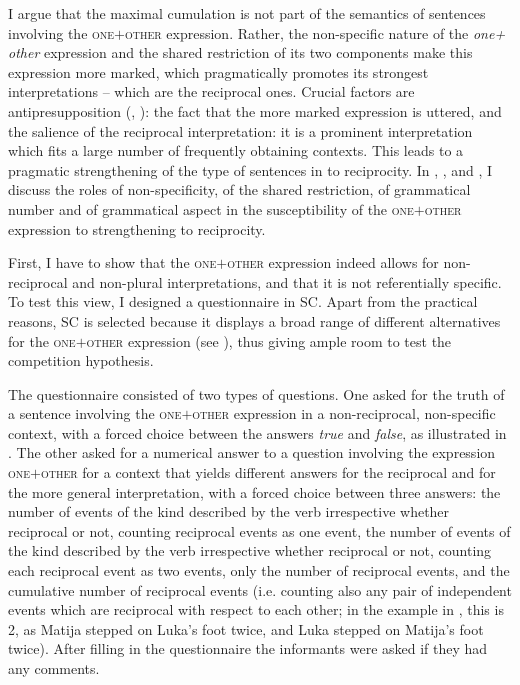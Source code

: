 \documentclass[output=paper,colorlinks,citecolor=brown]{langscibook}
\begin{document}
I argue that the maximal cumulation is not part of the semantics of sentences involving the \textsc{one$+$other} expression. Rather, the non-specific nature of the \textit{one+ other} expression and the shared restriction of its two components make this expression more marked, which pragmatically promotes its strongest interpretations -- which are the reciprocal ones. Crucial factors are antipresupposition (\citealt{h91}, \citealt{p06}): the fact that the more marked expression is uttered, and the salience of the reciprocal interpretation: it is a prominent interpretation which fits a large number of frequently obtaining contexts. This leads to a pragmatic strengthening of the type of sentences in  to reciprocity. In , , and , %
I discuss the roles of non-specificity, of the shared restriction, of grammatical number and of grammatical aspect in the susceptibility of the \textsc{one$+$other} expression to strengthening to reciprocity.

First, I have to show that the \textsc{one$+$other} expression indeed allows for non-reciprocal and non-plural interpretations, and that it is not referentially specific. To test this view, I designed a questionnaire in SC. Apart from the practical reasons, SC is selected because it displays a broad range of different alternatives for the \textsc{one$+$other} expression (see ), thus giving ample room to test the competition hypothesis.

The questionnaire consisted of two types of questions. One asked for the truth of a sentence involving the \textsc{one$+$other} expression in a non-reciprocal, non-specific context, with a forced choice between the answers \textit{true} and \textit{false}, as illustrated in . The other asked for a numerical answer to a question involving the expression \textsc{one$+$other} for a context that yields different answers for the reciprocal and for the more general interpretation, with a forced choice between three answers: the number of events of the kind described by the verb irrespective whether reciprocal or not, counting reciprocal events as one event, the number of events of the kind described by the verb irrespective whether reciprocal or not, counting each reciprocal event as two events, only the number of reciprocal events, and the cumulative number of reciprocal events (i.e. counting also any pair of independent events which are reciprocal with respect to each other; in the example in , this is 2, as Matija stepped on Luka's foot twice, and Luka stepped on Matija's foot twice). After filling in the questionnaire the informants were asked if they had any comments.
\end{document}
